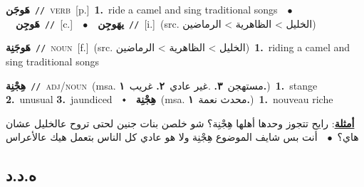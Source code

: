 \documentclass[10pt,a4paper,twoside]{article} %
\begin{document}
\begin{multicols}{2}
{\setlength\topsep{0pt}\textbf{\foreignlanguage{arabic}{هَوجَن}}\ {\color{gray}\texttt{//}\color{black}}\ \textsc{verb}\ [p.]\ \textbf{1.}~ride a camel and sing traditional songs\ \ $\bullet$\ \ \setlength\topsep{0pt}\textbf{\foreignlanguage{arabic}{هَوجِن}}\ {\color{gray}\texttt{//}\color{black}}\ [c.]\ \ $\bullet$\ \ \setlength\topsep{0pt}\textbf{\foreignlanguage{arabic}{يهَوجِن}}\ {\color{gray}\texttt{//}\color{black}}\ [i.]\ (src. \color{gray}\foreignlanguage{arabic}{الخليل > الظاهرية > الرماضين}\color{black})\ } \vspace{2mm}

{\setlength\topsep{0pt}\textbf{\foreignlanguage{arabic}{هَوجَنِة}}\ {\color{gray}\texttt{//}\color{black}}\ \textsc{noun}\ [f.]\ (src. \color{gray}\foreignlanguage{arabic}{الخليل > الظاهرية > الرماضين}\color{black})\ \textbf{1.}~riding a camel and sing traditional songs\ } \vspace{2mm}

{\setlength\topsep{0pt}\textbf{\foreignlanguage{arabic}{هِجْنِة}}\ {\color{gray}\texttt{//}\color{black}}\ \textsc{adj/noun}\ \color{gray}(msa. \foreignlanguage{arabic}{مستهجن}~\foreignlanguage{arabic}{\textbf{٣.}}  .\foreignlanguage{arabic}{غير عادي}~\foreignlanguage{arabic}{\textbf{٢.}}  \foreignlanguage{arabic}{غريب}~\foreignlanguage{arabic}{\textbf{١.}})\color{black}\ \textbf{1.}~stange  \textbf{2.}~unusual  \textbf{3.}~jaundiced\ \ $\smblkdiamond$\ \ \setlength\topsep{0pt}\textbf{\foreignlanguage{arabic}{هِجْنِة}}\ \color{gray}(msa. \foreignlanguage{arabic}{محدث نعمة}~\foreignlanguage{arabic}{\textbf{١.}})\color{black}\ \textbf{1.}~nouveau riche\  \begin{flushright}\color{gray}\foreignlanguage{arabic}{\textbf{\underline{\foreignlanguage{arabic}{أمثلة}}}: رايح تتجوز وحدها أهلها هِجْنِة؟ شو خلصن بنات جنين لحتى تروح عالخليل عشان هاي؟\ $\bullet$\ \  أنت بس شايف الموضوع هِجْنِة ولا هو عادي كل الناس بتعمل هيك عالأعراس}\end{flushright}\color{black}} \vspace{2mm}

\vspace{-3mm}
\subsection*{\color{blue}\foreignlanguage{arabic}{ه.د.د}\color{blue}{}} 


\end{multicols}
\end{document}
